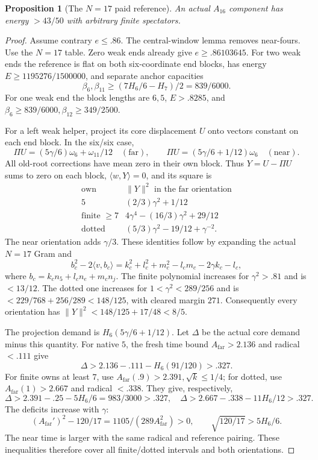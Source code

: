 \documentclass[11pt]{article}
\newtheorem{proposition}[theorem]{Proposition}
\theoremstyle{definition}
\theoremstyle{remark}
\newcommand{\ip}[2]{\langle #1,#2\rangle}
\newcommand{\norm}[1]{\lVert #1\rVert}
\begin{document}
\begin{proposition}[The \(N=17\) paid reference]
\label{app:prop:A16}
An actual \(A_{16}\) component has energy \(>43/50\)
with arbitrary finite spectators.
\end{proposition}
\begin{proof}
Assume contrary \(e\leq.86\). The central-window
lemma removes near-fours. Use the \(N=17\) table.
Zero weak ends already give \(e\geq.86103645\).
For two weak ends the reference is flat on both
six-coordinate end blocks, has energy
\(E\geq1195276/1500000\), and separate anchor capacities
\[
 \beta_6,\beta_{11}\geq
 (7H_6/6-H_7)/2=839/6000.
\]
For one weak end the block lengths are \(6,5\),
\(E>.8285\), and
\(\beta_6\geq839/6000,\beta_{12}\geq349/2500\).

For a left weak helper, project its core displacement
\(U\) onto vectors constant on each end block.
In the six/six case,
\[
 \Pi U=(5\gamma/6)\omega_6+\omega_{11}/12
       \quad(\text{far}),\qquad
 \Pi U=(5\gamma/6+1/12)\omega_6
       \quad(\text{near}).
\]
All old-root corrections have mean zero in their
own block. Thus \(Y=U-\Pi U\) sums to zero on each
block, \(\ip{w}{Y}=0\), and its square is
\[
\begin{array}{c|c}
\text{own}&\norm{Y}^2\text{ in the far orientation}\\ \hline
5&(2/3)\gamma^2+1/12\\
\text{finite }\geq7&4\gamma^4-(16/3)\gamma^2+29/12\\
\text{dotted}&(5/3)\gamma^2-19/12+\gamma^{-2}.
\end{array}
\]
The near orientation adds \(\gamma/3\).
These identities follow by expanding the actual
\(N=17\) Gram and
\[
 b_c^2-2\ip{v}{b_c}
 =k_c^2+l_c^2+m_c^2-l_cm_c-2\gamma k_c-l_c,
\]
where \(b_c=k_cn_5+l_cn_e+m_cn_j\).
The finite polynomial increases for \(\gamma^2>.81\)
and is \(<13/12\). The dotted one increases for
\(1<\gamma^2<289/256\) and is
\(<229/768+256/289<148/125\), with cleared margin \(271\).
Consequently every orientation has
\(\norm{Y}^2<148/125+17/48<8/5\).

The projection demand is \(H_6(5\gamma/6+1/12)\).
Let \(\Delta\) be the actual core demand minus this
quantity. For native \(5\), the fresh time bound
\(A_{\mathrm{far}}>2.136\) and radical \(<.111\)
give
\[
 \Delta>2.136-.111-H_6(91/120)>.327.
\]
For finite owns at least \(7\), use
\(A_{\mathrm{far}}(.9)>2.391,\sqrt k\leq1/4\);
for dotted, use \(A_{\mathrm{far}}(1)>2.667\)
and radical \(<.338\). They give, respectively,
\[
 \Delta>2.391-.25-5H_6/6=983/3000>.327,
 \quad
 \Delta>2.667-.338-11H_6/12>.327.
\]
The deficits increase with \(\gamma\):
\[
 (A_{\mathrm{far}}')^2-120/17
       =1105/(289A_{\mathrm{far}}^2)>0,\qquad
 \sqrt{120/17}>5H_6/6.
\]
The near time is larger with the same radical and
reference pairing. These inequalities therefore
cover all finite/dotted intervals and both orientations.


\end{proof}
\end{document}
